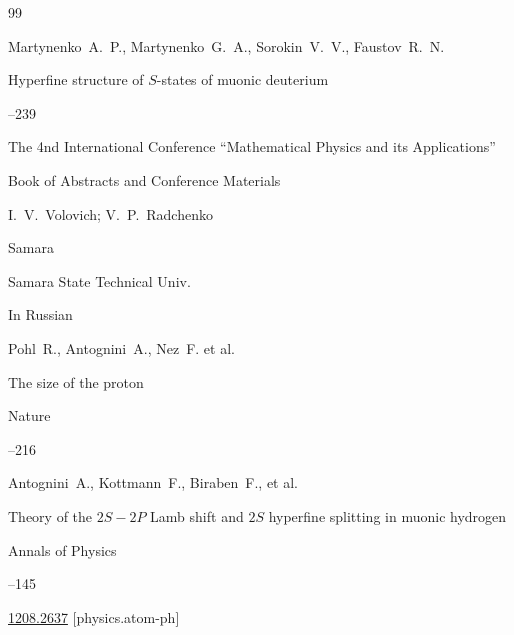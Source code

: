 \EngRef



\begin{thebibliography}{99}




\by  Martynenko~A.~P., Martynenko~G.~A., Sorokin~V.~V., Faustov~R.~N.

\paper  Hyperfine structure of $S$-states of muonic deuterium

--239

\inbook  The 4nd International Conference ``Mathematical Physics and its Applications''

\bookinfo Book of Abstracts and Conference Materials

\eds I.~V.~Volovich; V.~P.~Radchenko

\publaddr Samara

\publ Samara State Technical Univ.


\lang In Russian






\by Pohl~R., Antognini~A., Nez~F. et al.

\paper The size of the proton

\jour Nature




--216





\by Antognini~A., Kottmann~F., Biraben~F., et al.

\paper Theory of the $2S{-}2P$ Lamb shift and $2S$ hyperfine splitting in muonic hydrogen

\jour Annals of Physics



--145


\arxiv \href{http://arxiv.org/abs/1208.2637}{1208.2637} [physics.atom-ph]





\end{thebibliography}
